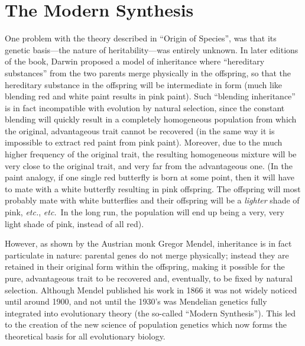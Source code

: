 \documentclass[11pt,a4paper]{book}
\newcommand{\etc}{\emph{etc.}}
\newcommand{\e}{\emph}
\begin{document}
\section{The Modern Synthesis}

One problem with the theory described in ``Origin of Species'', was that its genetic basis---the nature of heritability---was entirely unknown. In later editions of the book, Darwin proposed a model of inheritance where ``hereditary substances'' from the two parents merge physically in the offspring, so that the hereditary substance in the offspring will be intermediate in form (much like blending red and white paint results in pink paint). Such ``blending inheritance'' is in fact incompatible with evolution by natural selection, since the constant blending will quickly result in a completely homogeneous population from which the original, advantageous trait cannot be recovered (in the same way it is impossible to extract red paint from pink paint). Moreover, due to the much higher frequency of the original trait, the resulting homogeneous mixture will be very close to the original trait, and very  far from the advantageous one. (In the paint analogy, if one single red butterfly is born at some point, then it will have to mate with a white butterfly resulting in pink offspring. The offspring will most probably mate with white butterflies and their offspring will be a \e{lighter} shade of pink, \etc, \etc \ In the long run, the population will end up being a very, very light shade of pink, instead of all red). 


However, as shown by the Austrian monk Gregor Mendel, inheritance is in fact particulate in nature: parental genes do not merge physically; instead they are retained in their original form within the offspring, making it possible for  the pure, advantageous trait to be recovered and, eventually, to be fixed by natural selection.
 Although Mendel published his work in 1866 it was not widely noticed until around 1900, and not until the 1930's was Mendelian genetics fully integrated into evolutionary theory (the so-called ``Modern Synthesis''). This led to the creation of the new science of population genetics which now forms the theoretical basis for all evolutionary biology. 
\end{document}

